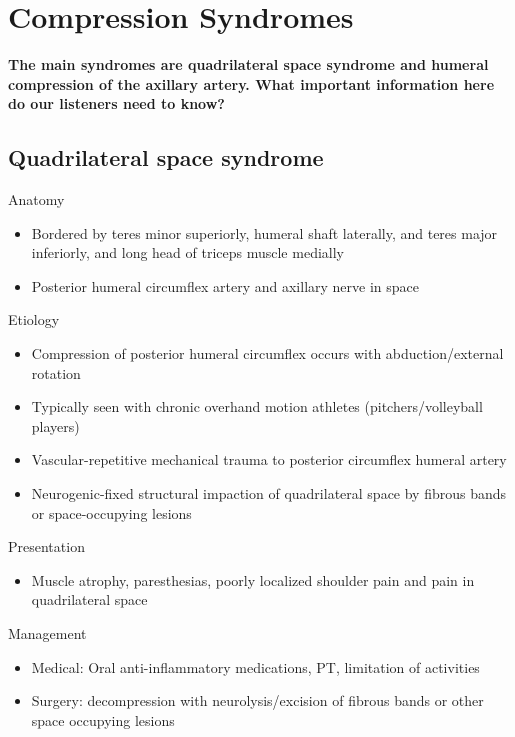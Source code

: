 \documentclass[
]{book}
\providecommand{\tightlist}{%
  \setlength{\itemsep}{0pt}\setlength{\parskip}{0pt}}
\begin{document}
\hypertarget{compression-syndromes}{%
\section{Compression Syndromes}\label{compression-syndromes}}

\textbf{The main syndromes are quadrilateral space syndrome and humeral
compression of the axillary artery. What important information here do
our listeners need to know?}

\hypertarget{quadrilateral-space-syndrome}{%
\subsection{Quadrilateral space syndrome}\label{quadrilateral-space-syndrome}}

Anatomy

\begin{itemize}
\item
  Bordered by teres minor superiorly, humeral shaft laterally, and
  teres major inferiorly, and long head of triceps muscle medially
\item
  Posterior humeral circumflex artery and axillary nerve in space
\end{itemize}

Etiology

\begin{itemize}
\item
  Compression of posterior humeral circumflex occurs with
  abduction/external rotation
\item
  Typically seen with chronic overhand motion athletes
  (pitchers/volleyball players)
\item
  Vascular-repetitive mechanical trauma to posterior circumflex
  humeral artery
\item
  Neurogenic-fixed structural impaction of quadrilateral space by
  fibrous bands or space-occupying lesions
\end{itemize}

Presentation

\begin{itemize}
\tightlist
\item
  Muscle atrophy, paresthesias, poorly localized shoulder pain and
  pain in quadrilateral space
\end{itemize}

Management

\begin{itemize}
\item
  Medical: Oral anti-inflammatory medications, PT, limitation of
  activities
\item
  Surgery: decompression with neurolysis/excision of fibrous bands or
  other space occupying lesions
\end{itemize}
\end{document}
